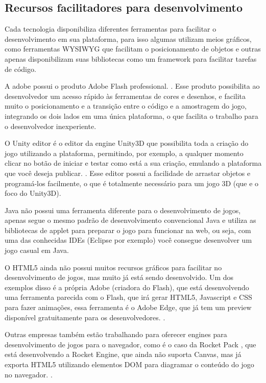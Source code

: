 \subsection{Recursos facilitadores para desenvolvimento}

Cada tecnologia disponibiliza diferentes ferramentas para facilitar o
desenvolvimento em sua plataforma, para isso algumas utilizam meios
gráficos, como ferramentas WYSIWYG que facilitam o posicionamento de
objetos e outras apenas disponibilizam suas bibliotecas como um
framework para facilitar tarefas de código.

A adobe possui o produto Adobe Flash professional. \cite{website:adobeflash}.
Esse produto possibilita ao desenvolvedor um acesso rápido às ferramentas de cores
e desenhos, e facilita muito o posicionamento e a transição entre o
código e a amostragem do jogo, integrando os dois lados em uma única
plataforma, o que facilita o trabalho para o desenvolvedor
inexperiente.

O Unity editor é o editor da engine Unity3D que possibilita toda a
criação do jogo utilizando a plataforma, permitindo, por exemplo, a
qualquer momento clicar no botão de iniciar e testar como está a sua
criação, emulando a plataforma que você deseja publicar. \cite{website:unity3d}.
Esse editor possui a facilidade de arrastar objetos e programá-los
facilmente, o que é totalmente necessário para um jogo 3D (que e o
foco do Unity3D).

Java não possui uma ferramenta diferente para o desenvolvimento de
jogos, apenas segue o mesmo padrão de desenvolvimento convencional
Java e utiliza as bibliotecas de applet para preparar o jogo para
funcionar na web, ou seja, com uma das conhecidas IDEs (Eclipse por
exemplo) você consegue desenvolver um jogo casual em Java.

O HTML5 ainda não possui muitos recursos gráficos para facilitar no
desenvolvimento de jogos, mas muito já está sendo desenvolvido. Um dos
exemplos disso é a própria Adobe (criadora do Flash), que está
desenvolvendo uma ferramenta parecida com o Flash, que irá gerar
HTML5, Javascript e CSS para fazer animações, essa ferramenta é o
Adobe Edge, que já tem um preview disponível
gratuitamente para os desenvolvedores. \cite{website:adobeedge}.

Outras empresas também estão trabalhando para oferecer engines para
desenvolvimento de jogos para o navegador, como é o caso da Rocket
Pack \cite{website:rocketpack}, que está desenvolvendo a Rocket Engine,
que ainda não suporta Canvas, mas já
exporta HTML5 utilizando elementos DOM para diagramar o conteúdo do
jogo no navegador. \cite{website:rocketengine}.
